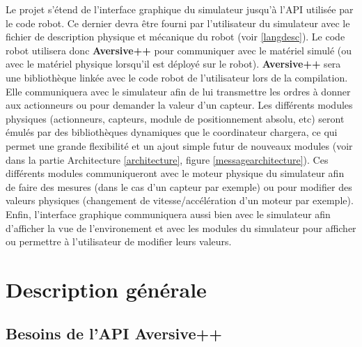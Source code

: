 \documentclass{scrreprt}
\begin{document}

Le projet s'étend de l'interface graphique du simulateur jusqu'à l'API utilisée par le code robot. Ce dernier devra être fourni par l'utilisateur du simulateur avec le fichier de description physique et mécanique du robot (voir \ref{langdesc}).
Le code robot utilisera donc \textbf{Aversive++} pour communiquer avec le matériel simulé (ou avec le matériel physique lorsqu'il est déployé sur le robot). \textbf{Aversive++} sera une bibliothèque linkée avec le code robot de l'utilisateur lors de la compilation. Elle communiquera avec le simulateur afin de lui transmettre les ordres à donner aux actionneurs ou pour demander la valeur d'un capteur. Les différents modules physiques (actionneurs, capteurs, module de positionnement absolu, etc) seront émulés par des bibliothèques dynamiques que le coordinateur chargera, ce qui permet une grande flexibilité et un ajout simple futur de nouveaux modules (voir dans la partie Architecture \ref{architecture}, figure \ref{messagearchitecture}). Ces différents modules communiqueront avec le moteur physique du simulateur afin de faire des mesures (dans le cas d'un capteur par exemple)  ou pour modifier des valeurs physiques (changement de vitesse/accélération d'un moteur par exemple). Enfin, l'interface graphique communiquera aussi bien avec le simulateur afin d'afficher la vue de l'environement et avec les modules du simulateur pour afficher ou permettre à l'utilisateur de modifier leurs valeurs.





      \chapter{Description générale}        %

\section{Besoins de l'API Aversive++}

\newpage
\end{document}

